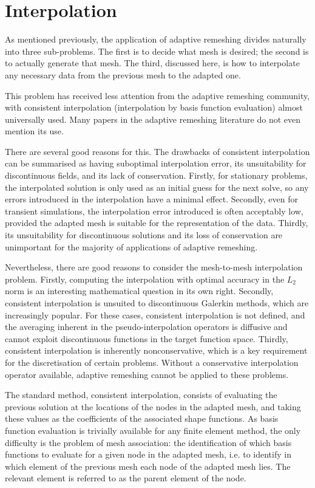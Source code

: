 \section{Interpolation} \label{sec:interpolation_algorithms}
As mentioned previously, the application of adaptive remeshing
divides naturally into three sub-problems. The first is to decide what mesh
is desired; the second is to actually generate that mesh.
The third, discussed here, is how to interpolate any necessary
data from the previous mesh to the adapted one.

This problem has received less attention from the adaptive remeshing
community, with consistent interpolation (interpolation by basis function
evaluation) almost universally
used. Many papers in the adaptive remeshing literature do not even mention
its use.

There are several good reasons for this. The drawbacks of consistent
interpolation can be summarised as having suboptimal interpolation error,
its unsuitability for discontinuous fields, and its lack of conservation. 
Firstly, for stationary problems, the
interpolated solution is only used as an initial guess for the next solve,
so any errors introduced in the interpolation have a minimal effect. 
Secondly, even for transient simulations, the interpolation error introduced
is often acceptably low, provided the adapted mesh is suitable for the representation
of the data. Thirdly, its unsuitability for
discontinuous solutions and its loss of conservation are unimportant for
the majority of applications of adaptive remeshing.

Nevertheless, there are good reasons to consider the mesh-to-mesh interpolation
problem. Firstly, computing the interpolation with optimal accuracy in the $L_2$
norm is an interesting mathematical question in its own right. Secondly, consistent interpolation is unsuited to discontinuous Galerkin methods,
which are increasingly popular. For these cases, consistent interpolation is not defined, and the averaging inherent in the pseudo-interpolation
operators is diffusive and cannot exploit discontinuous functions in the target
function space. Thirdly, consistent interpolation is inherently nonconservative,
which is a key requirement for the discretisation of certain problems.
Without a conservative interpolation operator available, adaptive remeshing
cannot be applied to these problems. 

The standard method, consistent interpolation, consists of evaluating
the previous solution at the locations of the nodes in the adapted
mesh, and taking these values as the coefficients of the associated shape
functions. As basis function evaluation is trivially available for
any finite element method, the only difficulty is the problem of mesh
association: the identification of which basis functions to evaluate for
a given node in the adapted mesh, i.e. to identify in which element of
the previous mesh each node of the adapted mesh lies. The relevant element
is referred to as the parent element of the node.


